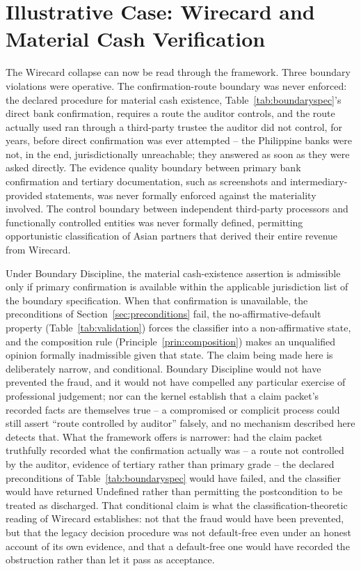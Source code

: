 \documentclass[11pt,a4paper]{article}
\theoremstyle{definition}
\theoremstyle{remark}
\begin{document}
\section{Illustrative Case: Wirecard and Material Cash Verification}
\label{sec:wirecard}

The Wirecard collapse can now be read through the framework. Three boundary violations were operative. The confirmation-route boundary was never enforced: the declared procedure for material cash existence, Table~\ref{tab:boundaryspec}'s direct bank confirmation, requires a route the auditor controls, and the route actually used ran through a third-party trustee the auditor did not control, for years, before direct confirmation was ever attempted -- the Philippine banks were not, in the end, jurisdictionally unreachable; they answered as soon as they were asked directly. The evidence quality boundary between primary bank confirmation and tertiary documentation, such as screenshots and intermediary-provided statements, was never formally enforced against the materiality involved. The control boundary between independent third-party processors and functionally controlled entities was never formally defined, permitting opportunistic classification of Asian partners that derived their entire revenue from Wirecard.

Under Boundary Discipline, the material cash-existence assertion is admissible only if primary confirmation is available within the applicable jurisdiction list of the boundary specification. When that confirmation is unavailable, the preconditions of Section~\ref{sec:preconditions} fail, the no-affirmative-default property (Table~\ref{tab:validation}) forces the classifier into a non-affirmative state, and the composition rule (Principle~\ref{prin:composition}) makes an unqualified opinion formally inadmissible given that state. The claim being made here is deliberately narrow, and conditional. Boundary Discipline would not have prevented the fraud, and it would not have compelled any particular exercise of professional judgement; nor can the kernel establish that a claim packet's recorded facts are themselves true -- a compromised or complicit process could still assert ``route controlled by auditor'' falsely, and no mechanism described here detects that. What the framework offers is narrower: had the claim packet truthfully recorded what the confirmation actually was -- a route not controlled by the auditor, evidence of tertiary rather than primary grade -- the declared preconditions of Table~\ref{tab:boundaryspec} would have failed, and the classifier would have returned \textsf{Undefined} rather than permitting the postcondition to be treated as discharged. That conditional claim is what the classification-theoretic reading of Wirecard establishes: not that the fraud would have been prevented, but that the legacy decision procedure was not default-free even under an honest account of its own evidence, and that a default-free one would have recorded the obstruction rather than let it pass as acceptance.
\end{document}
